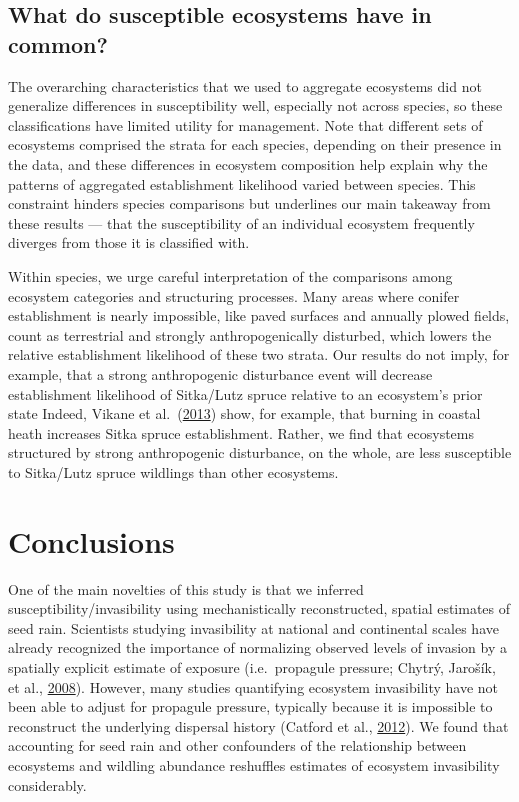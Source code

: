 \documentclass[
]{article}
\begin{document}
\hypertarget{what-do-susceptible-ecosystems-have-in-common}{%
\subsection{What do susceptible ecosystems have in common?}\label{what-do-susceptible-ecosystems-have-in-common}}

The overarching characteristics that we used to aggregate ecosystems did not generalize differences in susceptibility well, especially not across species, so these classifications have limited utility for management.
Note that different sets of ecosystems comprised the strata for each species, depending on their presence in the data, and these differences in ecosystem composition help explain why the patterns of aggregated establishment likelihood varied between species.
This constraint hinders species comparisons but underlines our main takeaway from these results --- that the susceptibility of an individual ecosystem frequently diverges from those it is classified with.

Within species, we urge careful interpretation of the comparisons among ecosystem categories and structuring processes.
Many areas where conifer establishment is nearly impossible, like paved surfaces and annually plowed fields, count as terrestrial and strongly anthropogenically disturbed, which lowers the relative establishment likelihood of these two strata.
Our results do not imply, for example, that a strong anthropogenic disturbance event will decrease establishment likelihood of Sitka/Lutz spruce relative to an ecosystem's prior state Indeed, Vikane et al.~(\protect\hyperlink{ref-vikaneInvasionCallunaHeath2013}{2013}) show, for example, that burning in coastal heath increases Sitka spruce establishment.
Rather, we find that ecosystems structured by strong anthropogenic disturbance, on the whole, are less susceptible to Sitka/Lutz spruce wildlings than other ecosystems.

\hypertarget{conclusions}{%
\section{Conclusions}\label{conclusions}}

One of the main novelties of this study is that we inferred susceptibility/invasibility using mechanistically reconstructed, spatial estimates of seed rain.
Scientists studying invasibility at national and continental scales have already recognized the importance of normalizing observed levels of invasion by a spatially explicit estimate of exposure (i.e.~propagule pressure; Chytrý, Jarošík, et al., \protect\hyperlink{ref-chytrySeparatingHabitatInvasibility2008}{2008}).
However, many studies quantifying ecosystem invasibility have not been able to adjust for propagule pressure, typically because it is impossible to reconstruct the underlying dispersal history (Catford et al., \protect\hyperlink{ref-catfordQuantifyingLevelsBiological2012}{2012}).
We found that accounting for seed rain and other confounders of the relationship between ecosystems and wildling abundance reshuffles estimates of ecosystem invasibility considerably.
\end{document}
